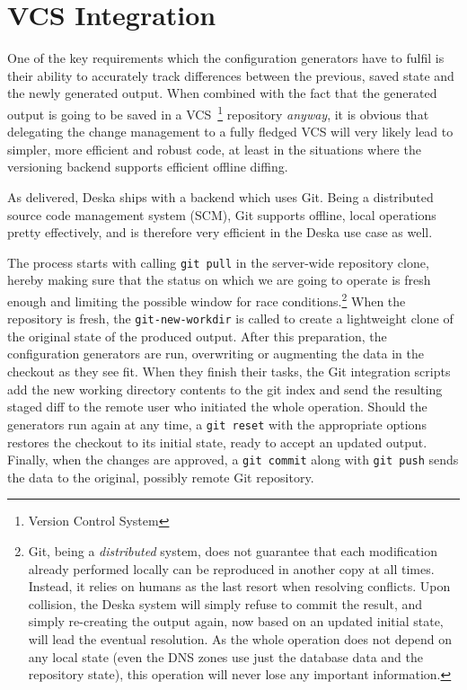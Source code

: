 \documentclass[deska]{subfiles}
\begin{document}
\section{VCS Integration}
\label{sec:cfggen-scm-integration}

One of the key requirements which the configuration generators have to fulfil is their ability to accurately track
differences between the previous, saved state and the newly generated output.  When combined with the fact that the
generated output is going to be saved in a VCS~\footnote{Version Control System} repository {\em anyway}, it is obvious
that delegating the change management to a fully fledged VCS will very likely lead to simpler, more efficient and robust
code, at least in the situations where the versioning backend supports efficient offline diffing.

As delivered, Deska ships with a backend which uses Git.  Being a distributed source code management system (SCM), Git
supports offline, local operations pretty effectively, and is therefore very efficient in the Deska use case as well.

The process starts with calling {\tt git pull} in the server-wide repository clone, hereby making sure that the status
on which we are going to operate is fresh enough and limiting the possible window for race conditions.\footnote{Git,
being a {\em distributed} system, does not guarantee that each modification already performed locally can be reproduced
in another copy at all times.  Instead, it relies on humans as the last resort when resolving conflicts.  Upon
collision, the Deska system will simply refuse to commit the result, and simply re-creating the output again, now based
on an updated initial state, will lead the eventual resolution.  As the whole operation does not depend on any local
state (even the DNS zones use just the database data and the repository state), this operation will never lose any
important information.}  When the repository is fresh, the {\tt git-new-workdir} is called to create a lightweight clone
of the original state of the produced output.  After this preparation, the configuration generators are run, overwriting
or augmenting the data in the checkout as they see fit.  When they finish their tasks, the Git integration scripts add
the new working directory contents to the git index and send the resulting staged diff to the remote user who initiated
the whole operation.  Should the generators run again at any time, a {\tt git reset} with the appropriate options
restores the checkout to its initial state, ready to accept an updated output.  Finally, when the changes are approved,
a {\tt git commit} along with {\tt git push} sends the data to the original, possibly remote Git repository.
\end{document}
